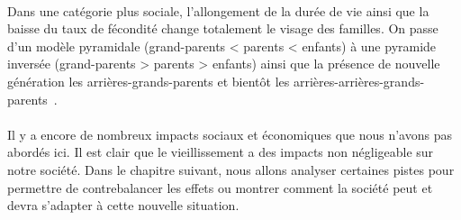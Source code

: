 \paragraph{}Dans une catégorie plus sociale, l’allongement de la durée de vie ainsi que la baisse du taux de fécondité change totalement le visage des familles. On passe d’un modèle pyramidale (grand-parents < parents < enfants) à une pyramide inversée  (grand-parents > parents > enfants) ainsi que la présence de nouvelle génération les arrières-grands-parents et bientôt les arrières-arrières-grands- parents~\citep[pp.13]{thesis}.

\paragraph{}Il y a encore de nombreux impacts sociaux et économiques que nous n’avons pas abordés ici. Il est clair que le vieillissement a des impacts non négligeable sur notre société. Dans le chapitre suivant, nous allons analyser certaines pistes pour permettre de contrebalancer les effets ou montrer comment la société peut et devra s’adapter à cette nouvelle situation. 
 

 
